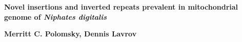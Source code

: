 \documentclass[../main.tex]{subfiles}
\begin{document}
\begin{titlepage}
   \begin{center}
       \vspace*{1cm}
        \huge
       \textbf{Novel insertions and inverted repeats prevalent in mitochondrial genome of \emph{Niphates digitalis}}
       \vspace{2.0cm}
       
       \large
       \textbf{Merritt C. Polomsky, Dennis Lavrov}
       \vfill
       \vspace{0.8cm}
   \end{center}
\end{titlepage}
\end{document}
